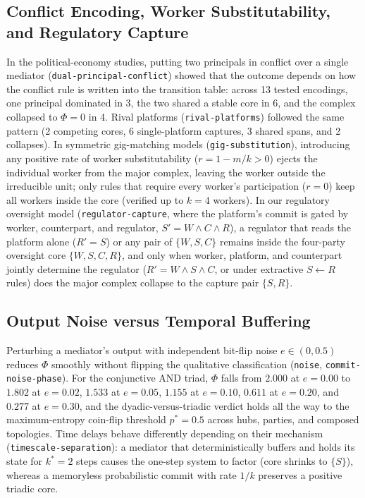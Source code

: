\documentclass[11pt,a4paper]{article}
\begin{document}
\subsection{Conflict Encoding, Worker Substitutability, and Regulatory Capture}

In the political-economy studies, putting two principals in conflict over a single mediator (\texttt{dual-principal-conflict}) showed that the outcome depends on how the conflict rule is written into the transition table: across 13 tested encodings, one principal dominated in 3, the two shared a stable core in 6, and the complex collapsed to $\Phi = 0$ in 4. Rival platforms (\texttt{rival-platforms}) followed the same pattern (2 competing cores, 6 single-platform captures, 3 shared spans, and 2 collapses). In symmetric gig-matching models (\texttt{gig-substitution}), introducing any positive rate of worker substitutability ($r = 1 - m/k > 0$) ejects the individual worker from the major complex, leaving the worker outside the irreducible unit; only rules that require every worker's participation ($r = 0$) keep all workers inside the core (verified up to $k = 4$ workers). In our regulatory oversight model (\texttt{regulator-capture}, where the platform's commit is gated by worker, counterpart, and regulator, $S' = W \wedge C \wedge R$), a regulator that reads the platform alone ($R' = S$) or any pair of $\{W, S, C\}$ remains inside the four-party oversight core $\{W, S, C, R\}$, and only when worker, platform, and counterpart jointly determine the regulator ($R' = W \wedge S \wedge C$, or under extractive $S \leftarrow R$ rules) does the major complex collapse to the capture pair $\{S, R\}$.

\subsection{Output Noise versus Temporal Buffering}

Perturbing a mediator's output with independent bit-flip noise $e \in (0, 0.5)$ reduces $\Phi$ smoothly without flipping the qualitative classification (\texttt{noise}, \texttt{commit-noise-phase}). For the conjunctive $\mathrm{AND}$ triad, $\Phi$ falls from $2.000$ at $e = 0.00$ to $1.802$ at $e = 0.02$, $1.533$ at $e = 0.05$, $1.155$ at $e = 0.10$, $0.611$ at $e = 0.20$, and $0.277$ at $e = 0.30$, and the dyadic-versus-triadic verdict holds all the way to the maximum-entropy coin-flip threshold $p^* = 0.5$ across hubs, parties, and composed topologies. Time delays behave differently depending on their mechanism (\texttt{timescale-separation}): a mediator that deterministically buffers and holds its state for $k^* = 2$ steps causes the one-step system to factor (core shrinks to $\{S\}$), whereas a memoryless probabilistic commit with rate $1/k$ preserves a positive triadic core.
\end{document}
